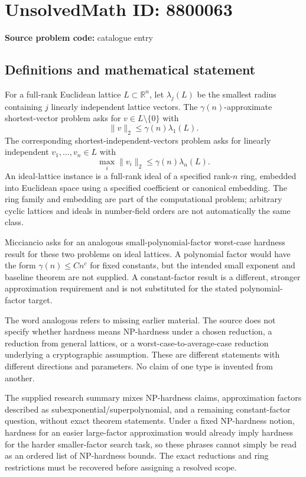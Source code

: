 \documentclass[11pt]{article}
\newcommand{\R}{\mathbb{R}}
\begin{document}
\section*{UnsolvedMath ID: 8800063}
\textbf{Source problem code:} catalogue entry
\subsection{Definitions and mathematical statement}
For a full-rank Euclidean lattice \(L\subset\R^n\), let \(\lambda_j(L)\) be the smallest radius containing \(j\) linearly independent lattice vectors. The \(\gamma(n)\)-approximate shortest-vector problem asks for \(v\in L\setminus\{0\}\) with
\[
\|v\|_2\le\gamma(n)\lambda_1(L).
\]
The corresponding shortest-independent-vectors problem asks for linearly independent \(v_1,\ldots,v_n\in L\) with
\[
\max_i\|v_i\|_2\le\gamma(n)\lambda_n(L).
\]
An ideal-lattice instance is a full-rank ideal of a specified rank-\(n\) ring, embedded into Euclidean space using a specified coefficient or canonical embedding. The ring family and embedding are part of the computational problem; arbitrary cyclic lattices and ideals in number-field orders are not automatically the same class.

Micciancio asks for an analogous small-polynomial-factor worst-case hardness result for these two problems on ideal lattices. A polynomial factor would have the form \(\gamma(n)\le Cn^c\) for fixed constants, but the intended small exponent and baseline theorem are not supplied. A constant-factor result is a different, stronger approximation requirement and is not substituted for the stated polynomial-factor target.

The word analogous refers to missing earlier material. The source does not specify whether hardness means NP-hardness under a chosen reduction, a reduction from general lattices, or a worst-case-to-average-case reduction underlying a cryptographic assumption. These are different statements with different directions and parameters. No claim of one type is invented from another.

The supplied research summary mixes NP-hardness claims, approximation factors described as subexponential/superpolynomial, and a remaining constant-factor question, without exact theorem statements. Under a fixed NP-hardness notion, hardness for an easier large-factor approximation would already imply hardness for the harder smaller-factor search task, so these phrases cannot simply be read as an ordered list of NP-hardness bounds. The exact reductions and ring restrictions must be recovered before assigning a resolved scope.
\end{document}
